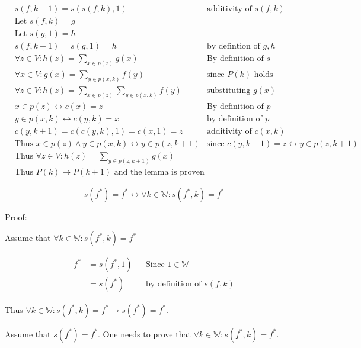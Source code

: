 \documentclass[11pt]{article}
\begin{document}
\begin{align*}
& \text{$s(f,k+1) = s(s(f,k),1)$} & \text{additivity of $s(f,k)$} \\
& \text{Let $s(f,k) = g$} & \text{} \\
& \text{Let $s(g,1) = h$} & \text{} \\
& \text{$s(f,k+1) = s(g,1) = h$} & \text{by defintion of $g,h$} \\
& \text{$\forall z \in V: h(z) = \sum_{x \in p(z)} g(x)$} & \text{By definition of $s$} \\
& \text{$\forall x \in V: g(x) = \sum_{y \in p(x,k)} f(y)$} & \text{since $P(k)$ holds} \\
& \text{$\forall z \in V: h(z) = \sum_{x \in p(z)} \sum_{y \in p(x,k)} f(y)$} & \text{substituting $g(x)$} \\
& \text{$x \in p(z) \leftrightarrow c(x)=z$} & \text{By definition of $p$} \\
& \text{$y \in p(x,k) \leftrightarrow c(y,k)=x$} & \text{by definition of $p$} \\
& \text{$c(y,k+1) = c(c(y,k),1) = c(x,1) = z$} & \text{additivity of $c(x,k)$} \\
& \text{Thus $x \in p(z) \land y \in p(x,k) \leftrightarrow y \in p(z,k+1)$} & \text{since $c(y,k+1)=z \leftrightarrow y \in p(z,k+1)$} \\
& \text{Thus $\forall z \in V: h(z) = \sum_{y \in p(z,k+1)} g(x)$} & \text{} \\
& \text{Thus $P(k) \rightarrow P(k+1)$ and the lemma is proven} & \text{}
\end{align*}

\begin{equation}
    s(f^{*}) = f^{*} \leftrightarrow \forall k \in\mathbb{W}: s(f^{*},k) = f^{*}
    \label{extend_fixed_point}
\end{equation}

Proof:

Assume that $\forall k \in \mathbb{W}: s(f^{*},k) = f^{*}$

\begin{align*}
    \text{$f^{*}$} &= \text{$s(f^{*},1)$} && \text{Since $1\in \mathbb{W}$} \\
    &= \text{$s(f^{*})$} && \text{by definition of $s(f,k)$}
\end{align*}

Thus $\forall k \in \mathbb{W}: s(f^{*},k) = f^{*} \rightarrow s(f^{*}) = f^{*}$.


Assume that $s(f^{*})=f^{*}$. One needs to prove that $\forall k \in \mathbb{W}: s(f^{*},k) = f^{*}$.
\end{document}

